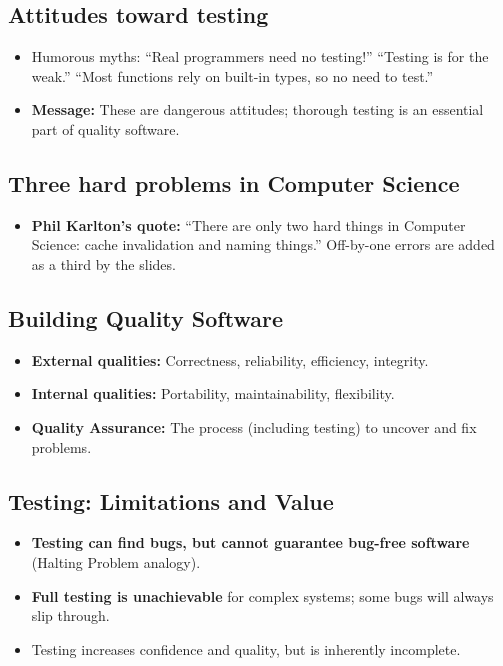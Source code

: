 \documentclass[11pt,a4paper]{article}
\begin{document}
\subsection*{Attitudes toward testing}
\begin{itemize}
    \item Humorous myths: “Real programmers need no testing!” “Testing is for the weak.” “Most functions rely on built-in types, so no need to test.”
    \item \textbf{Message:} These are dangerous attitudes; thorough testing is an essential part of quality software.
\end{itemize}

\subsection*{Three hard problems in Computer Science}
\begin{itemize}
    \item \textbf{Phil Karlton’s quote:} “There are only two hard things in Computer Science: cache invalidation and naming things.” Off-by-one errors are added as a third by the slides.
\end{itemize}

\subsection*{Building Quality Software}
\begin{itemize}
    \item \textbf{External qualities:} Correctness, reliability, efficiency, integrity.
    \item \textbf{Internal qualities:} Portability, maintainability, flexibility.
    \item \textbf{Quality Assurance:} The process (including testing) to uncover and fix problems.
\end{itemize}

\subsection*{Testing: Limitations and Value}
\begin{itemize}
    \item \textbf{Testing can find bugs, but cannot guarantee bug-free software} (Halting Problem analogy).
    \item \textbf{Full testing is unachievable} for complex systems; some bugs will always slip through.
    \item Testing increases confidence and quality, but is inherently incomplete.
\end{itemize}
\end{document}
